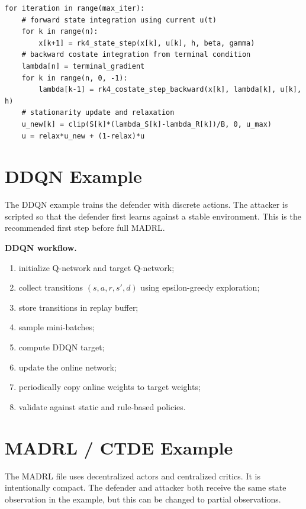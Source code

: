 \documentclass[11pt,a4paper]{article}
\begin{document}
\begin{lstlisting}[style=pythonstyle,caption={FBSM update logic.}]
for iteration in range(max_iter):
    # forward state integration using current u(t)
    for k in range(n):
        x[k+1] = rk4_state_step(x[k], u[k], h, beta, gamma)
    # backward costate integration from terminal condition
    lambda[n] = terminal_gradient
    for k in range(n, 0, -1):
        lambda[k-1] = rk4_costate_step_backward(x[k], lambda[k], u[k], h)
    # stationarity update and relaxation
    u_new[k] = clip(S[k]*(lambda_S[k]-lambda_R[k])/B, 0, u_max)
    u = relax*u_new + (1-relax)*u
\end{lstlisting}

\section{DDQN Example}
The DDQN example trains the defender with discrete actions. The attacker is scripted so that the defender first learns against a stable environment. This is the recommended first step before full MADRL.

\begin{workflowbox}
\textbf{DDQN workflow.}
\begin{enumerate}
\item initialize Q-network and target Q-network;
\item collect transitions $(s,a,r,s',d)$ using epsilon-greedy exploration;
\item store transitions in replay buffer;
\item sample mini-batches;
\item compute DDQN target;
\item update the online network;
\item periodically copy online weights to target weights;
\item validate against static and rule-based policies.
\end{enumerate}
\end{workflowbox}

\section{MADRL / CTDE Example}
The MADRL file uses decentralized actors and centralized critics. It is intentionally compact. The defender and attacker both receive the same state observation in the example, but this can be changed to partial observations.
\end{document}
